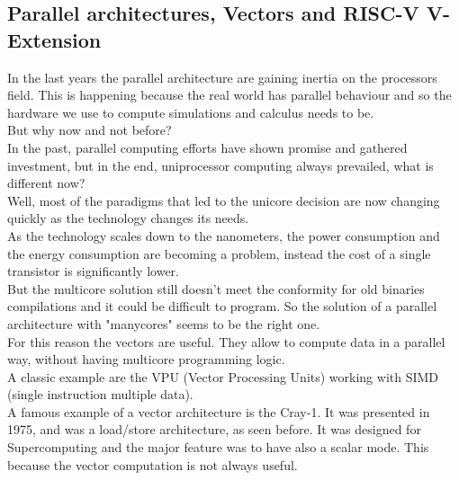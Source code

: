 \subsection{Parallel architectures, Vectors and RISC-V V-Extension}
In the last years the parallel architecture are gaining inertia on the processors field. This is happening because the real world has parallel behaviour and so the hardware we use to compute simulations and calculus needs to be.\cite{Parallel-Computing}\\
But why now and not before?\\
In the past, parallel computing efforts have shown promise and gathered investment, but in the end, uniprocessor computing always prevailed, what is different now?\\
Well, most of the paradigms that led to the unicore decision are now changing quickly as the technology changes its needs.\\
As the technology scales down to the nanometers, the power consumption and the energy consumption are becoming a problem, instead the cost of a single transistor is significantly lower.\\

But the multicore solution still doesn't meet the conformity for old binaries compilations and it could be difficult to program. So the solution of a parallel architecture with "manycores" seems to be the right one.\\

For this reason the vectors are useful. They allow to compute data in a parallel way, without having multicore programming logic.\\
A classic example are the VPU (Vector Processing Units) working with SIMD (single instruction multiple data).\\

A famous example of a vector architecture is the Cray-1. It was presented in 1975, and was a load/store architecture, as seen before.
It was designed for Supercomputing and the major feature was to have also a scalar mode. This because the vector computation is not always useful.\\

